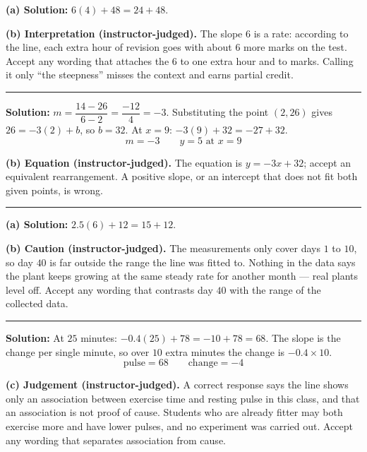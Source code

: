 \documentclass[12pt]{article}
\begin{document}
\textbf{(a) Solution:} \quad $6(4) + 48 = 24 + 48$. 

\textbf{(b) Interpretation (instructor-judged).} The slope $6$ is a rate: according to the line,
each extra hour of revision goes with about $6$ more marks on the test. Accept any wording that
attaches the $6$ to one extra hour and to marks. Calling it only ``the steepness'' misses the
context and earns partial credit.

\vspace{0.2cm}

\noindent\rule{\linewidth}{0.2pt}


\textbf{Solution:} \quad $m = \dfrac{14 - 26}{6 - 2} = \dfrac{-12}{4} = -3$. Substituting the
point $(2, 26)$ gives $26 = -3(2) + b$, so $b = 32$. At $x = 9$: $-3(9) + 32 = -27 + 32$.
\[ \boxed{m = -3 \qquad y = 5 \text{ at } x = 9} \]

\textbf{(b) Equation (instructor-judged).} The equation is $y = -3x + 32$; accept an equivalent
rearrangement. A positive slope, or an intercept that does not fit both given points, is wrong.

\vspace{0.2cm}

\noindent\rule{\linewidth}{0.2pt}


\textbf{(a) Solution:} \quad $2.5(6) + 12 = 15 + 12$. 

\textbf{(b) Caution (instructor-judged).} The measurements only cover days $1$ to $10$, so day
$40$ is far outside the range the line was fitted to. Nothing in the data says the plant keeps
growing at the same steady rate for another month --- real plants level off. Accept any wording
that contrasts day $40$ with the range of the collected data.

\vspace{0.2cm}

\noindent\rule{\linewidth}{0.2pt}


\textbf{Solution:} \quad At $25$ minutes: $-0.4(25) + 78 = -10 + 78 = 68$. The slope is the change
per single minute, so over $10$ extra minutes the change is $-0.4 \times 10$.
\[ \boxed{\text{pulse} = 68 \qquad \text{change} = -4} \]

\textbf{(c) Judgement (instructor-judged).} A correct response says the line shows only an
association between exercise time and resting pulse in this class, and that an association is not
proof of cause. Students who are already fitter may both exercise more and have lower pulses, and
no experiment was carried out. Accept any wording that separates association from cause.
\end{document}
